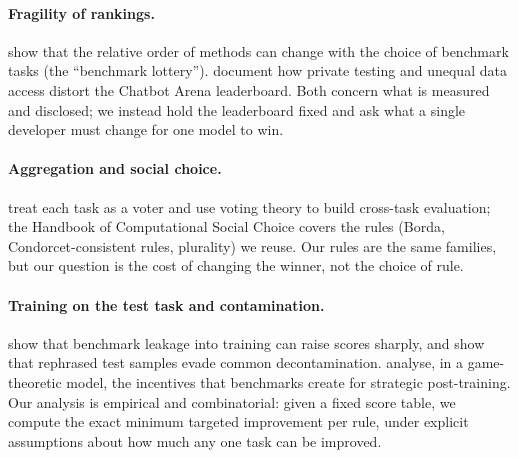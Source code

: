 \documentclass{article}
\begin{document}
\paragraph{Fragility of rankings.}
\citet{dehghani2021lottery} show that the relative order of methods can change with the choice of benchmark tasks (the ``benchmark lottery''). \citet{singh2025illusion} document how private testing and unequal data access distort the Chatbot Arena leaderboard. Both concern what is measured and disclosed; we instead hold the leaderboard fixed and ask what a single developer must change for one model to win.

\paragraph{Aggregation and social choice.}
\citet{lanctot2025vase} treat each task as a voter and use voting theory to build cross-task evaluation; the Handbook of Computational Social Choice \citep{brandt2016handbook} covers the rules (Borda, Condorcet-consistent rules, plurality) we reuse. Our rules are the same families, but our question is the cost of changing the winner, not the choice of rule.

\paragraph{Training on the test task and contamination.}
\citet{zhou2023cheater} show that benchmark leakage into training can raise scores sharply, and \citet{yang2023rephrased} show that rephrased test samples evade common decontamination. \citet{chen2026incentives} analyse, in a game-theoretic model, the incentives that benchmarks create for strategic post-training. Our analysis is empirical and combinatorial: given a fixed score table, we compute the exact minimum targeted improvement per rule, under explicit assumptions about how much any one task can be improved.
\end{document}
